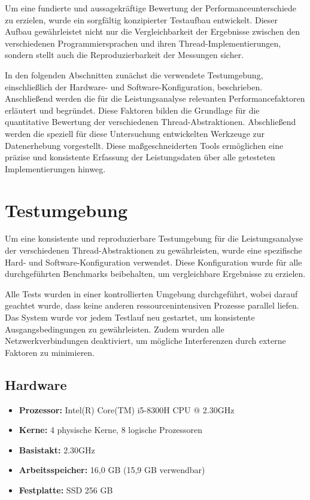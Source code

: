 \documentclass[fontsize=12pt,paper=a4,twoside=semi,parskip=half-,headsepline,headinclude]{scrreprt}
\begin{document}
Um eine fundierte und aussagekräftige Bewertung der Per\-for\-mance\-un\-ter\-schiede zu erzielen, wurde ein sorgfältig konzipierter Testaufbau entwickelt. Dieser Aufbau gewährleistet nicht nur die Vergleichbarkeit der Ergebnisse zwischen den verschiedenen Programmiersprachen und ihren Thread-Implementierungen, sondern stellt auch die Reproduzierbarkeit der Messungen sicher.

In den folgenden Abschnitten  zunächst die verwendete Testumgebung, einschließlich der Hardware- und Software-Konfiguration, beschrieben. Anschließend werden die für die Leistungsanalyse relevanten Performancefaktoren erläutert und begründet. Diese Faktoren bilden die Grundlage für die quantitative Bewertung der verschiedenen Thread-Abstraktionen. Abschließend werden die speziell für diese Untersuchung entwickelten Werkzeuge zur Datenerhebung vorgestellt. Diese maßgeschneiderten Tools ermöglichen eine präzise und konsistente Erfassung der Leistungsdaten über alle getesteten Implementierungen hinweg.

\section{Testumgebung}

Um eine konsistente und reproduzierbare Testumgebung für die Leistungsanalyse der verschiedenen Thread-Abstraktionen zu gewährleisten, wurde eine spezifische Hard- und Software-Konfiguration verwendet. Diese Konfiguration wurde für alle durchgeführten Benchmarks beibehalten, um vergleichbare Ergebnisse zu erzielen.

Alle Tests wurden in einer kontrollierten Umgebung durchgeführt, wobei darauf geachtet wurde, dass keine anderen ressourcenintensiven Prozesse parallel liefen. Das System wurde vor jedem Testlauf neu gestartet, um konsistente Ausgangsbedingungen zu gewährleisten. Zudem wurden alle Netzwerkverbindungen deaktiviert, um mögliche Interferenzen durch externe Faktoren zu minimieren.

\subsection{Hardware}

\begin{itemize}
	\item \textbf{Prozessor:} Intel(R) Core(TM) i5-8300H CPU @ 2.30GHz
	\item[] \hspace{0.8cm}\textbf{Kerne:} 4 physische Kerne, 8 logische Prozessoren
	\item[] \hspace{0.8cm}\textbf{Basistakt:} 2.30GHz
	\item \textbf{Arbeitsspeicher:} 16,0 GB (15,9 GB verwendbar)
	\item \textbf{Festplatte:} SSD 256 GB
\end{itemize}
\end{document}
